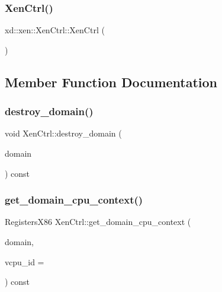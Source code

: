 \subsubsection{\texorpdfstring{Xen\+Ctrl()}{XenCtrl()}}
{\footnotesize\ttfamily xd\+::xen\+::\+Xen\+Ctrl\+::\+Xen\+Ctrl (\begin{DoxyParamCaption}{ }\end{DoxyParamCaption})}



\subsection{Member Function Documentation}
\mbox{\label{classxd_1_1xen_1_1_xen_ctrl_a68c5778543f8d8e9ca0e8f4a1f7535a7}} 
\subsubsection{\texorpdfstring{destroy\+\_\+domain()}{destroy\_domain()}}
{\footnotesize\ttfamily void Xen\+Ctrl\+::destroy\+\_\+domain (\begin{DoxyParamCaption}\item[{const \mbox{\hyperlink{classxd_1_1xen_1_1_domain}{Domain}} \&}]{domain }\end{DoxyParamCaption}) const}

\mbox{\label{classxd_1_1xen_1_1_xen_ctrl_adc47e85897cf94ffef388bd5b22e71ba}} 
\subsubsection{\texorpdfstring{get\+\_\+domain\+\_\+cpu\+\_\+context()}{get\_domain\_cpu\_context()}}
{\footnotesize\ttfamily Registers\+X86 Xen\+Ctrl\+::get\+\_\+domain\+\_\+cpu\+\_\+context (\begin{DoxyParamCaption}\item[{const \mbox{\hyperlink{classxd_1_1xen_1_1_domain}{Domain}} \&}]{domain,  }\item[{\mbox{\hyperlink{namespacexd_1_1xen_ac71045dda8a7d9d6fd0d7643001bb14e}{V\+C\+P\+U\+\_\+\+ID}}}]{vcpu\+\_\+id = {} }\end{DoxyParamCaption}) const}

